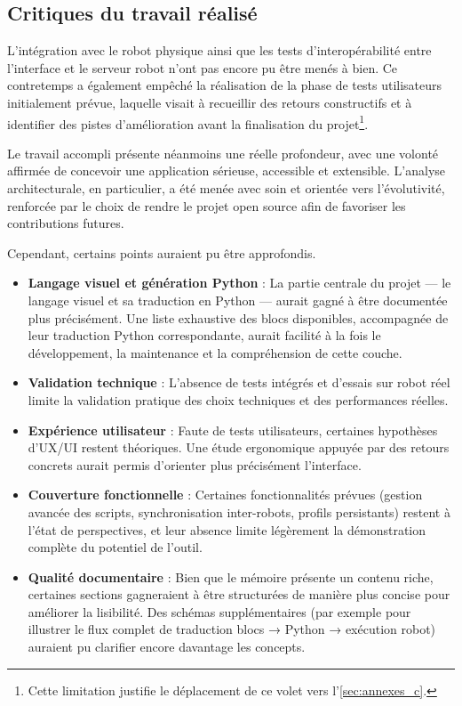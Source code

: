 \subsection{Critiques du travail réalisé} \label{sec:critiques}

L’intégration avec le robot physique ainsi que les tests d’interopérabilité entre l’interface et le serveur robot n’ont pas encore pu être menés à bien.
Ce contretemps a également empêché la réalisation de la phase de tests utilisateurs initialement prévue, laquelle visait à recueillir des retours constructifs et à identifier des pistes d’amélioration avant la finalisation du projet\footnote{Cette limitation justifie le déplacement de ce volet vers l'\autoref{sec:annexes_c}.}.

Le travail accompli présente néanmoins une réelle profondeur, avec une volonté affirmée de concevoir une application sérieuse, accessible et extensible.  
L’analyse architecturale, en particulier, a été menée avec soin et orientée vers l’évolutivité, renforcée par le choix de rendre le projet open source afin de favoriser les contributions futures.

Cependant, certains points auraient pu être approfondis.
\begin{itemize}
    \item \textbf{Langage visuel et génération Python} :  
    La partie centrale du projet — le langage visuel et sa traduction en Python — aurait gagné à être documentée plus précisément.  
    Une liste exhaustive des blocs disponibles, accompagnée de leur traduction Python correspondante, aurait facilité à la fois le développement, la maintenance et la compréhension de cette couche.
    
    \item \textbf{Validation technique} :  
    L’absence de tests intégrés et d’essais sur robot réel limite la validation pratique des choix techniques et des performances réelles.
    
    \item \textbf{Expérience utilisateur} :  
    Faute de tests utilisateurs, certaines hypothèses d’UX/UI restent théoriques. Une étude ergonomique appuyée par des retours concrets aurait permis d’orienter plus précisément l’interface.
    
    \item \textbf{Couverture fonctionnelle} :  
    Certaines fonctionnalités prévues (gestion avancée des scripts, synchronisation inter-robots, profils persistants) restent à l’état de perspectives, et leur absence limite légèrement la démonstration complète du potentiel de l’outil.
    
    \item \textbf{Qualité documentaire} :  
    Bien que le mémoire présente un contenu riche, certaines sections gagneraient à être structurées de manière plus concise pour améliorer la lisibilité.  
    Des schémas supplémentaires (par exemple pour illustrer le flux complet de traduction blocs → Python → exécution robot) auraient pu clarifier encore davantage les concepts.
\end{itemize}

